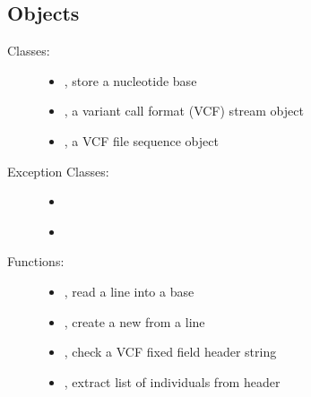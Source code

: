 \documentclass[letterpaper,10pt,english]{sphinxmanual}
\begin{document}
\subsection{Objects}
\label{vcf:objects}\begin{description}
\item[{Classes:}] \leavevmode\begin{itemize}
\item {} 
{\hyperref[vcf:libPoMo.vcf.NucBase]{}}, store a nucleotide base

\item {} 
{\hyperref[vcf:libPoMo.vcf.VCFStream]{}}, a variant call format (VCF) stream object

\item {} 
{\hyperref[vcf:libPoMo.vcf.VCFSeq]{}}, a VCF file sequence object

\end{itemize}

\item[{Exception Classes:}] \leavevmode\begin{itemize}
\item {} 
{\hyperref[vcf:libPoMo.vcf.NotAVariantCallFormatFileError]{}}

\item {} 
{\hyperref[vcf:libPoMo.vcf.NotANucBaseError]{}}

\end{itemize}

\item[{Functions:}] \leavevmode\begin{itemize}
\item {} 
{\hyperref[vcf:libPoMo.vcf.update_base]{}}, read a line into a base

\item {} 
{\hyperref[vcf:libPoMo.vcf.get_nuc_base_from_line]{}}, create a new  from a line

\item {} 
{\hyperref[vcf:libPoMo.vcf.check_fixed_field_header]{}}, check a VCF fixed field header
string

\item {} 
{\hyperref[vcf:libPoMo.vcf.get_indiv_from_field_header]{}}, extract list of individuals
from header


\end{itemize}
\end{description}
\end{document}
